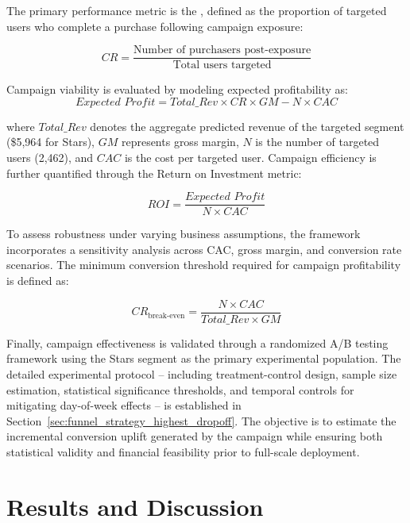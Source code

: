 \documentclass[conference]{IEEEtran}
\begin{document}
The primary performance metric is the , defined as the proportion of targeted users who 
complete a purchase following campaign exposure:

\begin{equation}
CR = \frac{\text{Number of purchasers post-exposure}}
          {\text{Total users targeted}}
\end{equation}

Campaign viability is evaluated by modeling expected 
profitability as:
\begin{equation}
\textit{Expected Profit} = \textit{Total\_Rev} \times CR 
\times GM - N \times CAC
\end{equation}

\noindent where $\textit{Total\_Rev}$ denotes the aggregate 
predicted revenue of the targeted segment (\$5,964 for 
Stars), $GM$ represents gross margin, $N$ is the number of 
targeted users (2,462), and $CAC$ is the cost per targeted 
user. Campaign efficiency is further quantified through the 
Return on Investment metric:

\begin{equation}
ROI = \frac{\textit{Expected Profit}}{N \times CAC}
\end{equation}

To assess robustness under varying business assumptions, 
the framework incorporates a sensitivity analysis across 
CAC, gross margin, and conversion rate scenarios. The 
minimum conversion threshold required for campaign 
profitability is defined as:

\begin{equation}
CR_{\text{break-even}} = \frac{N \times CAC}
{\textit{Total\_Rev} \times GM}
\end{equation}

Finally, campaign effectiveness is validated through a 
randomized A/B testing framework using the Stars segment 
as the primary experimental population. The detailed 
experimental protocol -- including treatment-control 
design, sample size estimation, statistical significance 
thresholds, and temporal controls for mitigating 
day-of-week effects -- is established in 
Section~\ref{sec:funnel_strategy_highest_dropoff}. The 
objective is to estimate the incremental conversion uplift 
generated by the campaign while ensuring both statistical 
validity and financial feasibility prior to full-scale 
deployment.

\section{Results and Discussion}
\end{document}

